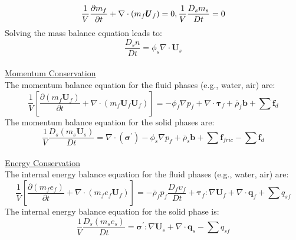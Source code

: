 \documentclass[preprint,12pt]{elsarticle}
\begin{document}
\begin{equation}
    \label{massbalance}
   \frac{1}{V}\frac{\partial m_f}{\partial t} + \nabla \cdot  (m_f \pmb{U}_f)= 0, \\ 
   \frac{1}{V}\frac{D_sm_s}{Dt} = 0    
\end {equation}
%
Solving the mass balance equation leads to:
%
%
\begin{equation}
  \frac{D_s n}{Dt} = \phi_s \nabla \cdot \pmb{U}_s  
\end {equation}
%
%
\underline{\hspace{5in}}\\
\underline{\textsf{Momentum Conservation}}\\
The momentum balance equation for the fluid phases (e.g., water, air) are:\\
%
%
\begin{equation}
     \frac{1}{V} \left[ \frac{\partial (m_f \pmb{U}_f)}{\partial t} + \nabla \cdot  (m_f \pmb{U}_f \pmb{U}_f) \right] = - \phi_f \nabla p_f  +  \nabla \cdot \pmb{\tau}_f + \overline{\rho}_f \pmb{b} +  \sum \pmb{f}_{d}
\end {equation}
%
%
The momentum balance equation for the solid phases are:\\
%
%
\begin{equation}
     \frac{1}{V}\frac{D_s(m_s \pmb{U}_s)}{Dt} = 
    \nabla \cdot (\pmb{\sigma}^\prime) - \phi_s \nabla p_f 
    + \overline{\rho}_s \pmb{b} +  \sum \pmb{f}_{fric}    -  \sum \pmb{f}_{d}
\end {equation}
%
%
\underline{\hspace{5in}}\\
\underline{\textsf{Energy Conservation}}\\
The internal energy balance equation for the fluid phases (e.g., water, air) are:
%
%
\begin{equation}
    \label{fluidenergy}
     \frac{1}{V} \left[ \frac{\partial (m_f e_f)}{\partial t} + \nabla \cdot  (m_f e_f \pmb{U}_f) \right]  = 
    -\overline{\rho}_f p_f  \frac{D_f\upsilon_f}{Dt} + \pmb{\tau}_f : \nabla \pmb{U}_f + \nabla \cdot \pmb{q}_f +  \sum q_{sf}
\end {equation}
%
%
The internal energy balance equation for the solid phase is:
%
%
\begin{equation}
    \label{solidenergy}
     \frac{1}{V}\frac{D_s(m_s e_s)}{Dt} = \pmb{\sigma}^\prime:\nabla \pmb{U}_s + \nabla \cdot \pmb{q}_s -  \sum q_{sf} 
\end {equation}
\end{document}
